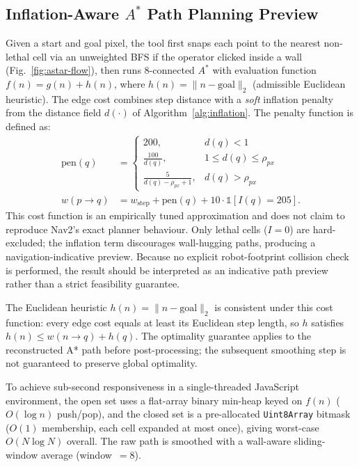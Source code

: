 \documentclass[journal]{IEEEtran}
\begin{document}
\subsection{Inflation-Aware \boldmath$A^{*}$ Path Planning Preview}
Given a start and goal pixel, the tool first snaps each point to the nearest non-lethal cell via an unweighted BFS if the operator clicked inside a wall (Fig.~\ref{fig:astar-flow}), then runs 8-connected $A^{*}$ \cite{hart1968formal} with evaluation function $f(n) = g(n) + h(n)$, where $h(n) = \lVert n - \text{goal} \rVert_2$ (admissible Euclidean heuristic). The edge cost combines step distance with a \emph{soft} inflation penalty from the distance field $d(\cdot)$ of Algorithm~\ref{alg:inflation}. The penalty function is defined as:
\begin{align}
\text{pen}(q) &=
\begin{cases}
200, & d(q) < 1\\
\frac{100}{d(q)}, & 1 \leq d(q) \leq \rho_{px}\\
\frac{5}{d(q) - \rho_{px} + 1}, & d(q) > \rho_{px}
\end{cases} \\
w(p \!\rightarrow\! q) &= w_{\text{step}} + \text{pen}(q) + 10\cdot\mathbb{1}[I(q)=205].
\end{align}
This cost function is an empirically tuned approximation and does not claim to reproduce Nav2's exact planner behaviour. Only lethal cells ($I=0$) are hard-excluded; the inflation term discourages wall-hugging paths, producing a navigation-indicative preview. Because no explicit robot-footprint collision check is performed, the result should be interpreted as an indicative path preview rather than a strict feasibility guarantee.

The Euclidean heuristic $h(n)=\lVert n-\text{goal}\rVert_2$ is consistent under this cost function: every edge cost equals at least its Euclidean step length, so $h$ satisfies $h(n)\leq w(n\!\rightarrow\!q)+h(q)$. The optimality guarantee applies to the reconstructed A* path before post-processing; the subsequent smoothing step is not guaranteed to preserve global optimality.

To achieve sub-second responsiveness in a single-threaded JavaScript environment, the open set uses a flat-array binary min-heap keyed on $f(n)$ ($O(\log n)$ push/pop), and the closed set is a pre-allocated \texttt{Uint8Array} bitmask ($O(1)$ membership, each cell expanded at most once), giving worst-case $O(N\log N)$ overall. The raw path is smoothed with a wall-aware sliding-window average (window~$=8$).
\end{document}
